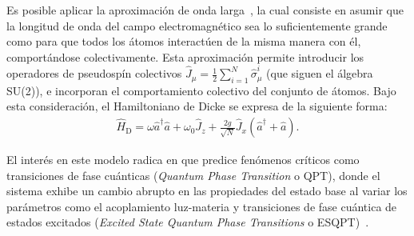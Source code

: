 \documentclass[onecolumn,notitlepage,letterpaper,aps,pra,12pt]{article}
\numberwithin{equation}{section}
\begin{document}
Es posible aplicar la aproximación de onda larga~\cite{Dicke54}, la cual consiste en asumir que la longitud de onda del campo electromagnético  sea lo suficientemente grande como para que todos los átomos interactúen de la misma manera con él, comportándose colectivamente. Esta aproximación permite introducir los operadores de pseudospín colectivos  $\hat{J}_{\mu} = \frac{1}{2}\sum_{i=1}^{N}\hat{\sigma}_{\mu}^{i}$ (que siguen el álgebra SU(2)),  e incorporan el comportamiento colectivo del conjunto de átomos. Bajo esta consideración, el Hamiltoniano de Dicke se expresa de la siguiente forma: 
\begin{gather}\label{Dicke colectivo}
    \hat{H}_{\text{D}} = \omega\hat{a}^{\dagger}\hat{a} + \omega_{0}\hat{J}_{z} + \frac{2g}{\sqrt{N}}\hat{J}_{x}\left( \hat{a}^{\dagger} + \hat{a} \right).
\end{gather}


El interés en este modelo  radica en que predice fenómenos críticos como transiciones de fase cuánticas (\textit{Quantum Phase Transition} o QPT), donde el sistema exhibe un cambio abrupto en las propiedades del estado base al variar los parámetros como el acoplamiento luz-materia y transiciones de fase cuántica de estados excitados (\textit{Excited State Quantum Phase Transitions} o ESQPT)~\cite{Hepp73,wang1973,hioe1973,Sachdev99,Larson17}. 
\end{document}
